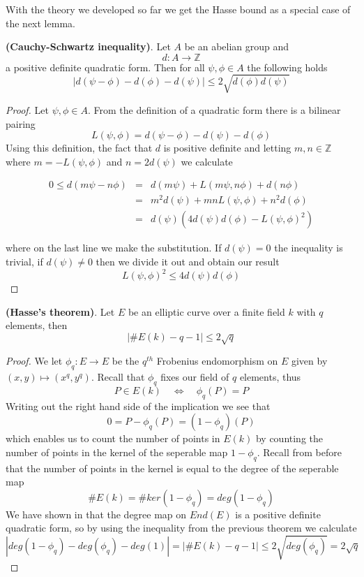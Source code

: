 With the theory we developed so far we get the Hasse bound as a special case of the next lemma.

\begin{lemma}
 \textbf{(Cauchy-Schwartz inequality)}. Let $A$ be an abelian group and
$$ d: A \rightarrow \mathbb{Z} $$
a positive definite quadratic form. Then for all $\psi, \phi \in A$ the following holds
$$ |d(\psi-\phi)-d(\phi)-d(\psi)| \leq 2 \sqrt{d(\phi)d(\psi)} $$
\end{lemma}
\begin{proof}
 Let $\psi, \phi \in A$. From the definition of a quadratic form there is a bilinear pairing
$$ L(\psi, \phi) = d(\psi-\phi) - d(\psi) - d(\phi) $$
Using this definition, the fact that $d$ is positive definite and letting $m,n \in \mathbb{Z}$ where
$m = -L(\psi, \phi)$ and $n = 2d(\psi)$ we calculate

\begin{eqnarray}
 0 \leq d(m\psi - n\phi) &=& d(m\psi) + L(m\psi, n\phi) + d(n\phi) \nonumber \\
			 &=& m^2 d(\psi) + mnL(\psi,\phi) + n^2 d(\phi) \nonumber \\
			 &=& d(\psi) \left( 4d(\psi)d(\phi)-L(\psi, \phi)^2 \right) \nonumber 
\end{eqnarray}

where on the last line we make the substitution. If $d(\psi)=0$ the inequality is trivial, if
$d(\psi) \neq 0$ then we divide it out and obtain our result
$$L(\psi, \phi)^2 \leq 4d(\psi)d(\phi) $$
\end{proof}


\begin{thm}
 \textbf{(Hasse's theorem)}. Let $E$ be an elliptic curve over a finite field $k$ with $q$ elements, then
$$ |\#E(k) - q - 1| \leq 2\sqrt{q} $$
\end{thm}
\begin{proof}
 We let $\phi_q: E \rightarrow E$ be the $q^{th}$ Frobenius endomorphism on $E$ given by 
$(x,y) \mapsto (x^q, y^q)$. Recall that $\phi_q$ fixes our field of $q$ elements, thus
$$ P \in E(k) \quad \iff \quad \phi_q(P) = P$$
Writing out the right hand side of the implication we see that
$$ 0 = P - \phi_q(P) = (1 - \phi_q)(P) $$
which enables us to count the number of points in $E(k)$ by counting the number of points in the kernel
of the seperable map $1-\phi_q$. Recall from before that the number of points in the kernel is equal
to the degree of the seperable map
$$ \#E(k) = \# ker(1-\phi_q) = deg(1-\phi_q) $$
We have shown in that the degree map on $End(E)$ is a positive definite quadratic form, so
by using the inequality from the previous theorem we calculate
$$|deg(1-\phi_q) - deg(\phi_q) - deg(1)| = |\#E(k) - q - 1| \leq 2\sqrt{deg(\phi_q)} = 2\sqrt{q}$$
\end{proof}

